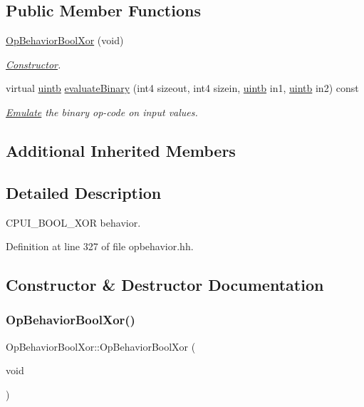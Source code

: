 \subsection*{Public Member Functions}
\begin{DoxyCompactItemize}
\item 
\mbox{\hyperlink{class_op_behavior_bool_xor_ad627b6dd492abf22e5f5bf84e7cc41d6}{Op\+Behavior\+Bool\+Xor}} (void)
\begin{DoxyCompactList}\small\item\em \mbox{\hyperlink{class_constructor}{Constructor}}. \end{DoxyCompactList}\item 
virtual \mbox{\hyperlink{types_8h_a2db313c5d32a12b01d26ac9b3bca178f}{uintb}} \mbox{\hyperlink{class_op_behavior_bool_xor_a30d4ce1c9ef1b344f61d8aab1bf6b930}{evaluate\+Binary}} (int4 sizeout, int4 sizein, \mbox{\hyperlink{types_8h_a2db313c5d32a12b01d26ac9b3bca178f}{uintb}} in1, \mbox{\hyperlink{types_8h_a2db313c5d32a12b01d26ac9b3bca178f}{uintb}} in2) const
\begin{DoxyCompactList}\small\item\em \mbox{\hyperlink{class_emulate}{Emulate}} the binary op-\/code on input values. \end{DoxyCompactList}\end{DoxyCompactItemize}
\subsection*{Additional Inherited Members}


\subsection{Detailed Description}
C\+P\+U\+I\+\_\+\+B\+O\+O\+L\+\_\+\+X\+OR behavior. 

Definition at line 327 of file opbehavior.\+hh.



\subsection{Constructor \& Destructor Documentation}
\mbox{\label{class_op_behavior_bool_xor_ad627b6dd492abf22e5f5bf84e7cc41d6}} 
\subsubsection{\texorpdfstring{OpBehaviorBoolXor()}{OpBehaviorBoolXor()}}
{\footnotesize\ttfamily Op\+Behavior\+Bool\+Xor\+::\+Op\+Behavior\+Bool\+Xor (\begin{DoxyParamCaption}\item[{void}]{ }\end{DoxyParamCaption})\hspace{0.3cm}{\ttfamily [inline]}}



